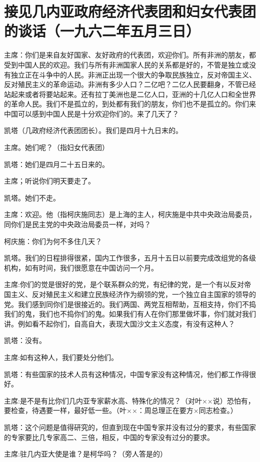 \section{接见几内亚政府经济代表团和妇女代表团的谈话（一九六二年五月三日）}


主席：你们是来自友好国家、友好政府的代表团，欢迎你们。所有非洲的朋友，都受到中国人民的欢迎。我们与所有非洲国家人民的关系都是好的，不管是独立或没有独立正在斗争中的人民。非洲正出现一个很大的争取民族独立，反对帝国主义、反对殖民主义的革命运动。非洲有多少人口？二亿吧？二亿人民要翻身，不管已经站起来或者将要站起来。还有拉丁美洲也是二亿人口，亚洲的十几亿人口和全世界的革命人民。我们不是孤立的，到处都有我们的朋友，你们也不是孤立的。你们来中国可以感到中国人民是十分欢迎你们的。来了几天了？

凯塔（几政府经济代表团团长）。我们是四月十九日末的。

主席。她们呢？（指妇女代表团）

凯塔：她们是四月二十五日来的。

主席；听说你们明天要走了。

凯塔。她们不走。

主席：欢迎。他（指柯庆施同志）是上海的主人，柯庆施是中共中央政治局委员，同你们是民主党的中央政治局委员一样，对吗？

柯庆施：你们为何不多住几天？

凯塔。我们的日程排得很紧，国内工作很多，五月十五日以前要完成改组党的各级机构，如有时间，我们很愿意在中国访问一个月。

主席:你们的觉是很好的党，是个联系群众的党，有纪律的党，是一个有以反对帝国主义、反对殖民主义和建立民族经济作为纲领的党，一个独立自主国家的领导的党。我们感到同你们是很接近的。我们两国、两党互相帮助，互相支持，你们不捣我们的鬼，我们也不捣你们的鬼。如果我们有人在你们那里做坏事，你们就对我们讲。例如看不起你们，自高自大，表现大国沙文主义态度，有没有这种人？

凯塔：没有。

主席:如有这种人，我们要处分他们。

凯塔：有些国家的技术人员有这种情况，中国专家没有这种情况，他们都工作得很好。

主席:是不是有比你们几内亚专家薪水高、特殊化的情况？（对叶××说）恐怕有，要检查，待遇要一样，最好低一些。（叶××：周总理正在要方×同志检查。）

凯塔：这个问题是值得研究的，但直到现在中国专家并没有过分的要求，有些国家的专家要比几专家高二、三倍，相反，中国的专家没有过分的要求。

主席:驻几内亚大使是谁？是柯华吗？（旁人答是的）

